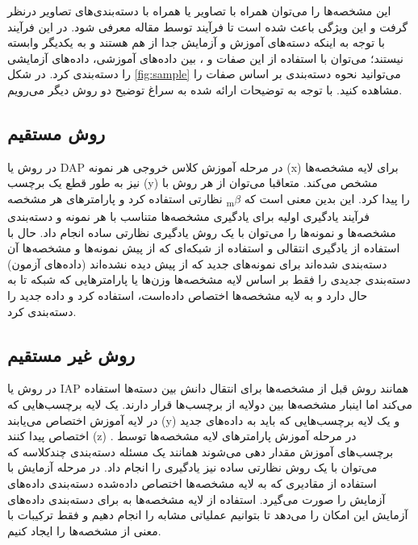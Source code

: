 \newpage
این مشخصه‌ها را می‌توان همراه با تصاویر یا همراه با دسته‌بندی‌های تصاویر درنظر گرفت و این ویژگی باعث شده است تا فرآیند 
توسط مقاله معرفی شود. در این فرآیند با توجه به اینکه دسته‌های آموزش و آزمایش جدا از هم هستند و به یکدیگر وابسته نیستند؛ می‌توان با استفاده از این صفات و 
،
بین داده‌های آموزشی، داده‌های آزمایشی را دسته‌بندی کرد. در شکل 
\ref{fig:sample}
می‌توانید نحوه دسته‌بندی بر اساس صفات را مشاهده کنید.
با توجه به توضیحات ارائه شده به سراغ توضیح دو روش دیگر می‌رویم.
\subsection{روش مستقیم}
در روش 
یا DAP در مرحله آموزش کلاس خروجی هر نمونه (x) برای لایه مشخصه‌ها نیز به طور قطع یک برچسب (y) مشخص می‌کند. متعاقبا می‌توان از هر روش با نظارتی استفاده کرد و  پارامتر‌های هر مشخصه‌ 
\textsubscript{m}$\beta$ 
را پیدا کرد. این بدین معنی است که فرآیند یادگیری اولیه برای یادگیری مشخصه‌ها متناسب با هر نمونه و دسته‌بندی مشخصه‌ها و نمونه‌ها را می‌توان با یک روش یادگیری نظارتی ساده انجام داد. حال با استفاده از یادگیری انتقالی و استفاده از شبکه‌ای که از پیش نمونه‌ها و مشخصه‌ها آن دسته‌بندی شده‌اند برای نمونه‌های جدید   که از پیش دیده نشده‌اند (داده‌های آزمون) دسته‌بندی جدیدی را فقط بر اساس لایه مشخصه‌ها وزن‌ها یا پارامتر‌هایی که شبکه تا به حال دارد و به لایه مشخصه‌ها اختصاص داده‌است، استفاده کرد و داده جدید را دسته‌بندی کرد.

\subsection{روش غیر مستقیم}
در روش 
یا IAP همانند روش قبل از مشخصه‌ها برای انتقال دانش بین دسته‌ها استفاده می‌کند اما اینبار مشخصه‌ها بین دولایه از برچسب‌ها قرار دارند. یک لایه برچسب‌هایی که در لایه آموزش اختصاص می‌یابند (y) و یک لایه برچسب‌هایی که باید به داده‌های جدید اختصاص پیدا کنند (z) . در مرحله آموزش پارامتر‌های لایه مشخصه‌ها توسط برچسب‌های آموزش مقدار دهی می‌شوند همانند یک مسئله دسته‌بندی چند‌کلاسه که می‌توان با یک روش نظارتی ساده نیز یادگیری را انجام داد. در مرحله آزمایش با استفاده از مقادیری که به لایه مشخصه‌ها اختصاص داده‌شده دسته‌بندی داده‌های آزمایش را صورت می‌گیرد. استفاده از لایه مشخصه‌ها به برای دسته‌بندی داده‌های آزمایش این امکان را می‌دهد تا بتوانیم عملیاتی مشابه 
را انجام دهیم و فقط ترکیبات با معنی از مشخصه‌ها را ایجاد کنیم.

